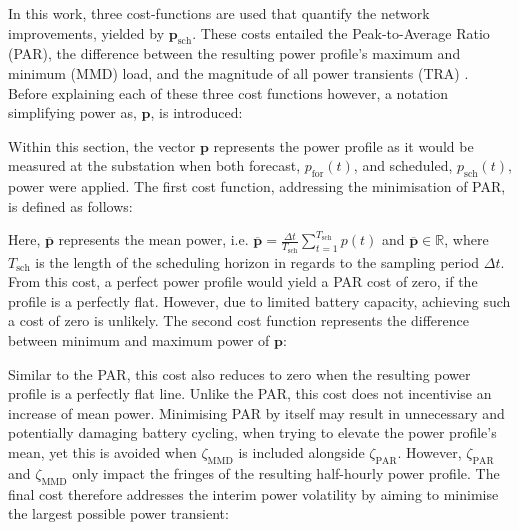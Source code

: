 In this work, three cost-functions are used that quantify the network improvements, yielded by $\textbf{p}_\text{sch}$.
These costs entailed the Peak-to-Average Ratio (PAR), the difference between the resulting power profile's maximum and minimum (MMD) load, and the magnitude of all power transients (TRA) \cite{Mohsenian-Rad2010, Mostafa2016}.
Before explaining each of these three cost functions however, a notation simplifying power as, $\textbf{p}$, is introduced:



Within this section, the vector $\textbf{p}$ represents the power profile as it would be measured at the substation when both forecast, $p_\text{for}(t)$, and scheduled, $p_\text{sch}(t)$, power were applied.
The first cost function, addressing the minimisation of PAR, is defined as follows:





Here, $\overline{\textbf{p}}$ represents the mean power, i.e. $\overline{\textbf{p}} = \frac{\Delta t}{T_\text{sch}}\sum_{t=1}^{T_\text{sch}}p(t)$ and $\overline{\textbf{p}} \in \mathbb{R}$, where $T_\text{sch}$ is the length of the scheduling horizon in regards to the sampling period $\Delta t$.
From this cost, a perfect power profile would yield a PAR cost of zero, if the profile is a perfectly flat.
However, due to limited battery capacity, achieving such a cost of zero is unlikely.
The second cost function represents the difference between minimum and maximum power of $\textbf{p}$:




Similar to the PAR, this cost also reduces to zero when the resulting power profile is a perfectly flat line.
Unlike the PAR, this cost does not incentivise an increase of mean power.
Minimising PAR by itself may result in unnecessary and potentially damaging battery cycling, when trying to elevate the power profile's mean, yet this is avoided when $\zeta_\text{MMD}$ is included alongside $\zeta_\text{PAR}$.
However, $\zeta_\text{PAR}$ and $\zeta_\text{MMD}$ only impact the fringes of the resulting half-hourly power profile.
The final cost therefore addresses the interim power volatility by aiming to minimise the largest possible power transient:

